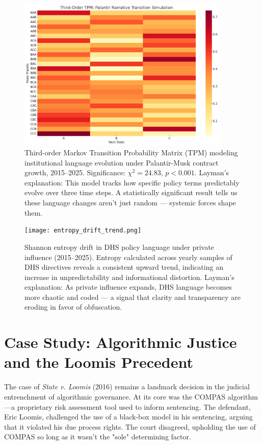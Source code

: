 \begin{figure}[h!]
  \centering
 \includegraphics[width=0.9\textwidth]{assets/figures/third_order_TPM.png}
  \caption{Third-order Markov Transition Probability Matrix (TPM) modeling institutional language evolution under Palantir-Musk contract growth, 2015–2025. Significance: \(\chi^2 = 24.83\), \(p < 0.001\). Layman's explanation: This model tracks how specific policy terms predictably evolve over three time steps. A statistically significant result tells us these language changes aren't just random — systemic forces shape them.}
\end{figure}

\begin{figure}[h!]
  \centering
  \texttt{[image: entropy\_drift\_trend.png]}
    \caption{Shannon entropy drift in DHS policy language under private influence (2015–2025). Entropy calculated across yearly samples of DHS directives reveals a consistent upward trend, indicating an increase in unpredictability and informational distortion. Layman's explanation: As private influence expands, DHS language becomes more chaotic and coded — a signal that clarity and transparency are eroding in favor of obfuscation.}
\end{figure}

\section{Case Study: Algorithmic Justice and the Loomis Precedent}
The case of \textit{State v. Loomis} (2016) remains a landmark decision in the judicial entrenchment of algorithmic governance. At its core was the COMPAS algorithm—a proprietary risk assessment tool used to inform sentencing. The defendant, Eric Loomis, challenged the use of a black-box model in his sentencing, arguing that it violated his due process rights. The court disagreed, upholding the use of COMPAS so long as it wasn't the "sole" determining factor.

